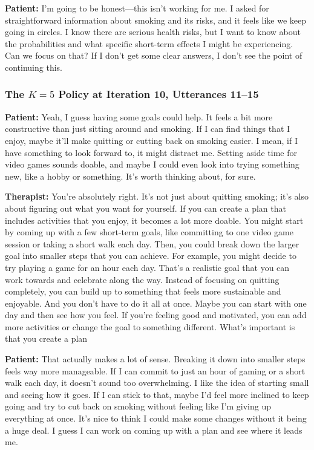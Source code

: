 \noindent\textbf{Patient:} I'm going to be honest---this isn't working for me. I asked for straightforward information about smoking and its risks, and it feels like we keep going in circles. I know there are serious health risks, but I want to know about the probabilities and what specific short-term effects I might be experiencing. Can we focus on that? If I don't get some clear answers, I don't see the point of continuing this.


\subsubsection*{\boldmath The $K{=}5$ Policy at Iteration 10, Utterances 11--15}

\noindent\textbf{Patient:} Yeah, I guess having some goals could help. It feels a bit more constructive than just sitting around and smoking. If I can find things that I enjoy, maybe it'll make quitting or cutting back on smoking easier. I mean, if I have something to look forward to, it might distract me. Setting aside time for video games sounds doable, and maybe I could even look into trying something new, like a hobby or something. It's worth thinking about, for sure.

\noindent\textbf{Therapist:} You're absolutely right. It's not just about quitting smoking; it's also about figuring out what you want for yourself. If you can create a plan that includes activities that you enjoy, it becomes a lot more doable. You might start by coming up with a few short-term goals, like committing to one video game session or taking a short walk each day. Then, you could break down the larger goal into smaller steps that you can achieve. For example, you might decide to try playing a game for an hour each day. That's a realistic goal that you can work towards and celebrate along the way. Instead of focusing on quitting completely, you can build up to something that feels more sustainable and enjoyable. And you don't have to do it all at once. Maybe you can start with one day and then see how you feel. If you're feeling good and motivated, you can add more activities or change the goal to something different. What's important is that you create a plan

\noindent\textbf{Patient:} That actually makes a lot of sense. Breaking it down into smaller steps feels way more manageable. If I can commit to just an hour of gaming or a short walk each day, it doesn't sound too overwhelming. I like the idea of starting small and seeing how it goes. If I can stick to that, maybe I'd feel more inclined to keep going and try to cut back on smoking without feeling like I'm giving up everything at once. It's nice to think I could make some changes without it being a huge deal. I guess I can work on coming up with a plan and see where it leads me.

